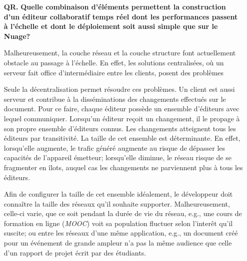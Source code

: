 \begin{itemize}
\item [\textbf{QR.}] \textbf{Quelle combinaison d'éléments permettent la
    construction d'un éditeur collaboratif temps réel dont les performances
    passent à l'échelle et dont le déploiement soit aussi simple que sur le
    Nuage?}
  
  Malheureusement, la couche réseau et la couche structure font actuellement
  obstacle au passage à l'échelle. En effet, les solutions centralisées, où un
  serveur fait office d'intermédiaire entre les clients, posent des problèmes
  Seule la décentralisation permet résoudre ces problèmes. Un client est aussi
  serveur et contribue à la disséminations des changements effectués sur le
  document. Pour ce faire, chaque éditeur possède un ensemble d'éditeurs avec
  lequel communiquer. Lorsqu'un éditeur reçoit un changement, il le propage à
  son propre ensemble d'éditeurs connus. Les changements atteignent tous les
  éditeurs par transitivité. La taille de cet ensemble est déterminante. En
  effet, lorsqu'elle augmente, le trafic généré augmente au risque de dépasser
  les capacités de l'appareil émetteur; lorsqu'elle diminue, le réseau risque de
  se fragmenter en îlots, auquel cas les changements ne parviennent plus à tous
  les éditeurs.

  Afin de configurer la taille de cet ensemble idéalement, le développeur doit
  connaître la taille des réseaux qu'il souhaite supporter. Malheureusement,
  celle-ci varie, que ce soit pendant la durée de vie du réseau, e.g., une cours
  de formation en ligne (\emph{MOOC}) voit sa population fluctuer selon
  l'interêt qu'il suscite; ou entre les réseaux d'une même application, e.g., un
  document créé pour un événement de grande ampleur n'a pas la même audience que
  celle d'un rapport de projet écrit par des étudiants.



\end{itemize}
